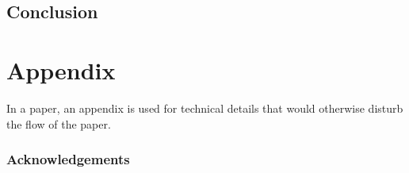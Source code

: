 \documentclass[11pt,twoside]{book}
\begin{document}
\chapter{Conclusion}
\label{chap:conclusion}



\clearpage
\cleardoublepage
{}
\renewcommand{\bibname}{References}
\footnotesize{    
  
%  
  
}%
% 
% 

\clearpage
\appendix
\part*{Appendix}

In a paper, an appendix is used for technical details that would otherwise disturb the flow of the paper.


\cleardoublepage
{}
{}
\printglossary[type=\acronymtype, title=List of Acronyms, toctitle=List of Acronyms]

\clearpage
\section*{Acknowledgements}
\end{document}
